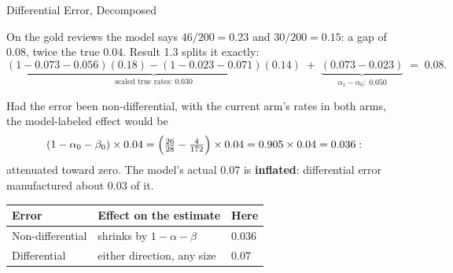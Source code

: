 \documentclass[aspectratio=169, 11pt, handout]{beamer}
\begin{document}
\begin{frame}{Differential Error, Decomposed}

On the gold reviews the model says $46/200 = 0.23$ and $30/200 = 0.15$: a gap of $0.08$, twice the true $0.04$. Result 1.3 splits it exactly:
\[
\underbrace{(1 - 0.073 - 0.056)(0.18) - (1 - 0.023 - 0.071)(0.14)}_{\text{scaled true rates: } 0.030}
\;+\; \underbrace{(0.073 - 0.023)}_{\alpha_1 - \alpha_0:\; 0.050} \;=\; 0.08 .
\]

\bigskip

Had the error been non-differential, with the current arm's rates in both arms, the model-labeled effect would be
\[
(1 - \alpha_0 - \beta_0) \times 0.04 = \Bigl(\tfrac{26}{28} - \tfrac{4}{172}\Bigr) \times 0.04 = 0.905 \times 0.04 = 0.036 :
\]
attenuated toward zero. The model's actual $0.07$ is \textbf{inflated}: differential error manufactured about 0.03 of it.

\begin{center}
\small
\begin{tabular}{lll}
\toprule
\textbf{Error} & \textbf{Effect on the estimate} & \textbf{Here} \\
\midrule
Non-differential & shrinks by $1 - \alpha - \beta$ & $0.036$ \\
Differential & either direction, any size & $0.07$ \\
\bottomrule
\end{tabular}
\end{center}
\end{frame}
\end{document}
